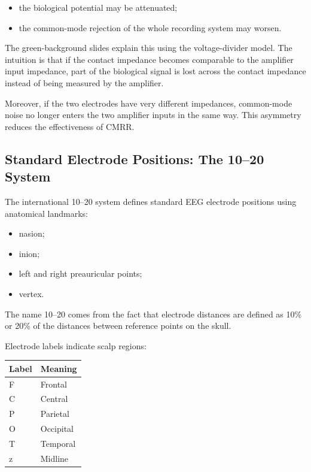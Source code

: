 \begin{itemize}[noitemsep]
    \item the biological potential may be attenuated;
    \item the common-mode rejection of the whole recording system may worsen.
\end{itemize}

\begin{noexam}
The green-background slides explain this using the voltage-divider model. The intuition is that if the contact impedance becomes comparable to the amplifier input impedance, part of the biological signal is lost across the contact impedance instead of being measured by the amplifier.

Moreover, if the two electrodes have very different impedances, common-mode noise no longer enters the two amplifier inputs in the same way. This asymmetry reduces the effectiveness of CMRR.
\end{noexam}

\subsection{Standard Electrode Positions: The 10--20 System}

The international 10--20 system defines standard EEG electrode positions using anatomical landmarks:

\begin{itemize}[noitemsep]
    \item nasion;
    \item inion;
    \item left and right preauricular points;
    \item vertex.
\end{itemize}

The name 10--20 comes from the fact that electrode distances are defined as 10\% or 20\% of the distances between reference points on the skull.

Electrode labels indicate scalp regions:

\begin{center}
\begin{tabular}{ll}
\toprule
\textbf{Label} & \textbf{Meaning} \\
\midrule
F & Frontal \\
C & Central \\
P & Parietal \\
O & Occipital \\
T & Temporal \\
z & Midline \\
\bottomrule
\end{tabular}
\end{center}

